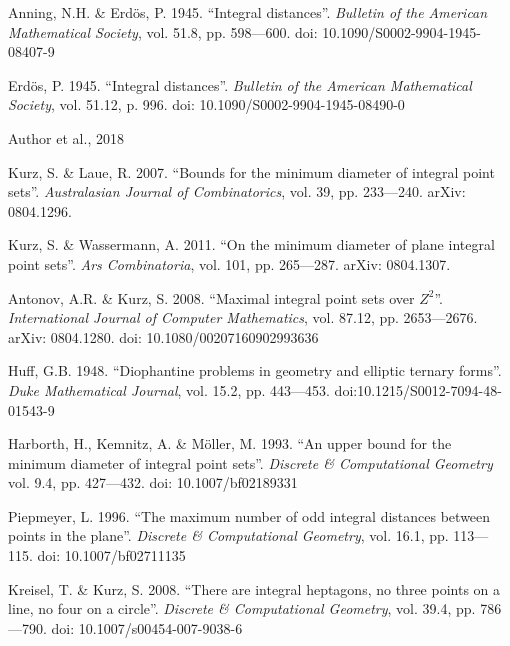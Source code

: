 \begin{engbibliography}{99}

	Anning, N.H. \& Erdös, P. 1945.
	“Integral distances”.
	\emph{Bulletin of the American Mathematical Society}, vol. 51.8, pp. 598—600.
	doi: 10.1090/S0002-9904-1945-08407-9

	Erdös, P. 1945.
	“Integral distances”.
	\emph{Bulletin of the American Mathematical Society}, vol. 51.12, p. 996.
	doi: 10.1090/S0002-9904-1945-08490-0

	Author et al., 2018

	Kurz, S. \& Laue, R. 2007.
	“Bounds for the minimum diameter of integral point sets”.
	\emph{Australasian Journal of Combinatorics}, vol. 39, pp. 233—240. arXiv: 0804.1296.

	Kurz, S. \& Wassermann, A. 2011.
	“On the minimum diameter of plane integral point sets”.
	\emph{Ars Combinatoria}, vol. 101, pp. 265—287. arXiv: 0804.1307.

	Antonov, A.R. \& Kurz, S. 2008.
	“Maximal integral point sets over $Z^2$”.
	\emph{International Journal of Computer Mathematics}, vol. 87.12, pp. 2653—2676. arXiv: 0804.1280.
	doi: 10.1080/00207160902993636

	Huff, G.B. 1948.
	“Diophantine problems in geometry and elliptic ternary forms”.
	\emph{Duke Mathematical Journal}, vol. 15.2, pp. 443—453.
	doi:10.1215/S0012-7094-48-01543-9

	Harborth, H., Kemnitz, A. \& Möller, M. 1993.
	“An upper bound for the minimum diameter of integral point sets”.
	\emph{Discrete \& Computational Geometry} vol. 9.4, pp. 427—432.
	doi: 10.1007/bf02189331

	Piepmeyer, L. 1996.
	“The maximum number of odd integral distances between points in the plane”.
	\emph{Discrete \& Computational Geometry}, vol. 16.1, pp. 113—115.
	doi: 10.1007/bf02711135

	Kreisel, T. \& Kurz, S. 2008.
	“There are integral heptagons, no three points on a line, no four on a circle”.
	\emph{Discrete \& Computational Geometry}, vol. 39.4, pp. 786—790.
	doi: 10.1007/s00454-007-9038-6


\end{engbibliography}
